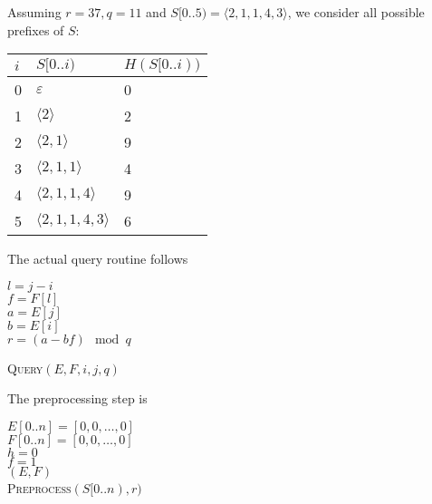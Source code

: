 \documentclass[10pt]{article}
\begin{document}
Assuming $r = 37, q = 11$ and $S[0..5) = \langle 2, 1, 1, 4, 3 \rangle$, we consider all possible prefixes of $S$:
\begin{center}
\begin{tabular}{|l|l|l|}
\hline
$i$ & $S[0..i)$ & $H(S[0..i))$ \\
\hline
0 & $ \varepsilon $ 								& 0 \\
1 & $\langle 2 \rangle $ 					& 2 \\
2 & $\langle 2, 1 \rangle $ 				& 9 \\
3 & $\langle 2, 1, 1 \rangle $ 			& 4 \\
4 & $\langle 2, 1, 1, 4 \rangle $ 		& 9 \\
5 & $\langle 2, 1, 1, 4, 3 \rangle $ & 6\\
\hline
\end{tabular}
\end{center}
The actual query routine follows
\begin{algorithm}
$l = j - i$ \\
$f = F[l]$ \\
$a = E[j]$ \\
$b = E[i]$ \\
$r = (a - bf) \mod q $ \\
\caption{\textsc{Query}$(E, F, i, j, q)$}
\end{algorithm}
The preprocessing step is
\begin{algorithm}
$E[0..n] = [0, 0, \dots, 0]$ \\
$F[0..n] = [0, 0, \dots, 0]$ \\
$h = 0$ \\
$f = 1$ \\
\KwRet $(E, F)$ \\
\caption{\textsc{Preprocess}$(S[0..n), r)$}
\end{algorithm}
\end{document}
